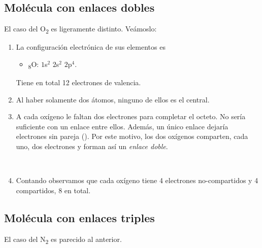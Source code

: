 \documentclass[twoside,a4paper,justified,12pt]{tufte-handout}
\renewcommand{\sb}[1]{\textsubscript{#1}}
\begin{document}
\subsection{Molécula con enlaces dobles}

El caso del O\sb{2} es ligeramente distinto. Veámoslo:

\begin{enumerate}[1)]
    \item La configuración electrónica de sus elementos es
    \begin{itemize}
        \item \sb{8}O: $1$s$^2$ $2$s$^2$ $2$p$^4$.
    \end{itemize}
    
    Tiene en total 12 electrones de valencia.
    
    \item Al haber solamente dos átomos, ninguno de ellos es el central.
    
    \item A cada oxígeno le faltan dos electrones para completar el octeto. No sería suficiente con un enlace entre ellos. Además, un único enlace dejaría electrones sin pareja (\hspace{1ex}\hspace{1ex}). Por este motivo, los dos oxígenos comparten, cada uno, dos electrones y forman así un \textit{enlace doble}.
        
     {\centering{}\\}
     
     \item Contando observamos que cada oxígeno tiene 4 electrones no-compartidos y 4 compartidos, 8 en total.
     
\end{enumerate}

\subsection{Molécula con enlaces triples}

El caso del N\sb{2} es parecido al anterior.
\end{document}
